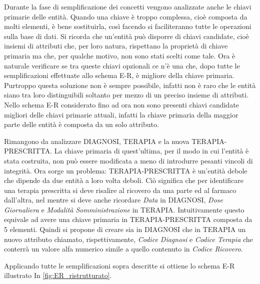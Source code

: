 \documentclass{article}
\begin{document}
Durante la fase di semplificazione dei concetti vengono analizzate anche le chiavi primarie delle entità.
Quando una chiave è troppo complessa, cioè composta da molti elementi, è bene sostituirla, così facendo si faciliteranno tutte le operazioni sulla base di dati.
Si ricorda che un'entità può disporre di chiavi candidate, cioè insiemi di attributi che, per loro natura, rispettano la proprietà di chiave primaria ma che, per qualche motivo, non sono stati scelti come tale.
Ora è naturale verificare se tra queste chiavi opzionali ce n'è una che, dopo tutte le semplificazioni effettuate allo schema E-R, è migliore della chiave primaria.
Purtroppo questa soluzione non è sempre possibile, infatti non è raro che le entità siano tra loro distinguibili soltanto per mezzo di un preciso insieme di attributi.
Nello schema E-R considerato fino ad ora non sono presenti chiavi candidate migliori delle chiavi primarie attuali, infatti la chiave primaria della maggior parte delle entità è composta da un solo attributo.

Rimangono da analizzare DIAGNOSI, TERAPIA e la nuova TERAPIA-PRESCRITTA.
La chiave primaria di quest'ultima, per il modo in cui l'entità è stata costruita, non può essere modificata a meno di introdurre pesanti vincoli di integrità.
Ora sorge un problema: TERAPIA-PRESCRITTA è un'entità debole che dipende da due entità a loro volta deboli.
Ciò significa che per identificare una terapia prescritta si deve risalire al ricovero da una parte ed al farmaco dall'altra, nel mentre si deve anche ricordare \textit{Data} in DIAGNOSI, \textit{Dose Giornaliera} e \textit{Modalità Somministrazione} in TERAPIA.
Intuitivamente questo equivale ad avere una chiave primaria in TERAPIA-PRESCRITTA composta da 5 elementi.
Quindi si propone di creare sia in DIAGNOSI che in TERAPIA un nuovo attributo chiamato, rispettivamente, \textit{Codice Diagnosi} e \textit{Codice Terapia} che conterrà un valore alfa numerico simile a quello contenuto in \textit{Codice Ricovero}.

Applicando tutte le semplificazioni sopra descritte si ottiene lo schema E-R illustrato In \autoref{fig:ER_ristrutturato}.
\end{document}
